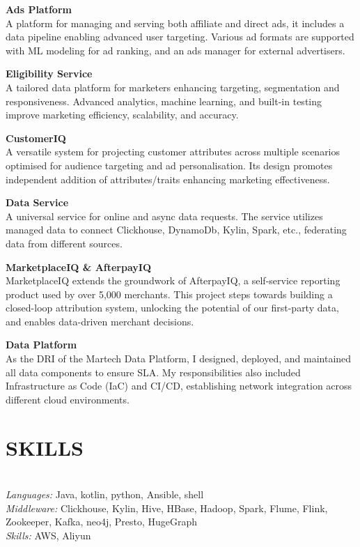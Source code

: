 \documentclass{res}
\begin{document}
\begin{resume}
\vspace{-15pt}
{\bf Ads Platform} \\
A platform for managing and serving both affiliate and direct ads, it includes a data pipeline enabling advanced user targeting. Various ad formats are supported with ML modeling for ad ranking, and an ads manager for external advertisers.

\vspace{-5pt}
{\bf Eligibility Service} \\
A tailored data platform for marketers enhancing targeting, segmentation and responsiveness. Advanced analytics, machine learning, and built-in testing improve marketing efficiency, scalability, and accuracy.

\vspace{-5pt}
{\bf CustomerIQ} \\
A versatile system for projecting customer attributes across multiple scenarios optimised for audience targeting and ad personalisation. Its design promotes independent addition of attributes/traits enhancing marketing effectiveness.

\vspace{-5pt}
{\bf Data Service} \\
A universal service for online and async data requests. The service utilizes managed data to connect Clickhouse, DynamoDb, Kylin, Spark, etc., federating data from different sources. 

\vspace{-5pt}
{\bf MarketplaceIQ \& AfterpayIQ} \\
MarketplaceIQ extends the groundwork of AfterpayIQ, a self-service reporting product used by over 5,000 merchants. This project steps towards building a closed-loop attribution system, unlocking the potential of our first-party data, and enables data-driven merchant decisions.

\vspace{-5pt}
{\bf Data Platform} \\
As the DRI of the Martech Data Platform, I designed, deployed, and maintained all data components to ensure SLA. My responsibilities also included Infrastructure as Code (IaC) and CI/CD, establishing network integration across different cloud environments.

\section{SKILLS}
\vspace{-10pt}
\hrulefill\\
{\sl Languages:} Java, kotlin, python, Ansible, shell\\
{\sl Middleware:} Clickhouse, Kylin, Hive, HBase, Hadoop, Spark, Flume, Flink, Zookeeper, Kafka, neo4j, Presto, HugeGraph\\
{\sl Skills:} AWS, Aliyun



\end{resume}
\end{document}
